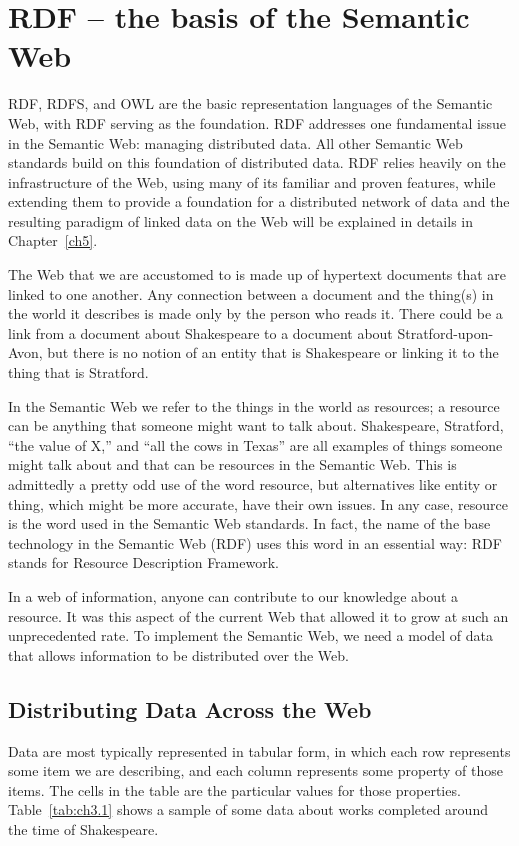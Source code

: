 \chapter{RDF -- the basis of the Semantic Web}
\label{ch3}
RDF, RDFS, and OWL are the basic representation languages of the
Semantic Web, with RDF serving as the foundation. RDF addresses one
fundamental issue in the Semantic Web: managing distributed data. All
other Semantic Web standards build on this foundation of distributed
data. RDF relies heavily on the infrastructure of the Web, using many of
its familiar and proven features, while extending them to provide a
foundation for a distributed network of data and the resulting paradigm
of linked data on the Web will be explained in details in Chapter~\ref{ch5}.

The Web that we are accustomed to is made up of hypertext documents that are
linked to one another. Any connection between a document and the
thing(s) in the world it describes is made only by the person who reads
it. There could be a link from a document about Shakespeare to
a document about Stratford-upon-Avon, but there is no notion of an
entity that is Shakespeare or linking it to the thing that is Stratford.

In the Semantic Web we refer to the things in the world as resources; a
resource can be anything that someone might want to talk about. Shakespeare, Stratford, ``the
value of X,'' and ``all the cows in Texas'' are all examples of things
someone might talk about and that can be resources in the Semantic Web.
This is admittedly a pretty odd use of the word resource, but
alternatives like entity or thing, which might be more accurate, have
their own issues. In any case, resource is the word used in the
Semantic Web standards. In fact, the name of the base technology in the
Semantic Web (RDF) uses this word in an essential way: RDF stands for
Resource Description Framework.

In a web of information, anyone can contribute to our knowledge about a
resource. It was this aspect of the current Web that allowed it to grow
at such an unprecedented rate. To implement the Semantic Web, we need a
model of data that allows information to be distributed over the Web.

\section{Distributing Data Across the Web}
\label{distribute}
Data are most typically represented in tabular form, in which each row
represents some item we are describing, and each column represents some
property of those items. The cells in the table are the particular
values for those properties. Table~\ref{tab:ch3.1} shows a sample of some data about
works completed around the time of Shakespeare.

